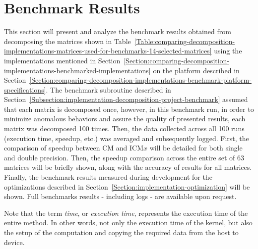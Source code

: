 \section{Benchmark Results \TO}\label{Section:comparing-decomposition-implementations-benchmark-results}
This section will present and analyze the benchmark results obtained from decomposing the matrices shown in Table~\ref{Table:comparing-decomposition-implementations-matrices-used-for-benchmarks-14-selected-matrices} using the implementations mentioned in Section~\ref{Section:comparing-decomposition-implementations-benchmarked-implementations} on the platform described in Section~\ref{Section:comparing-decomposition-implementations-benchmark-platform-specifications}. The benchmark subroutine described in Section~\ref{Subsection:implementation-decomposition-project-benchmark} assumed that each matrix is decomposed once, however, in this benchmark run, in order to minimize anomalous behaviors and assure the quality of presented results, each matrix was decomposed 100 times. Then, the data collected across all 100 runs (execution time, speedup, etc.) was averaged and subsequently logged. First, the comparison of speedup between CM and ICM$ x $ will be detailed for both single and double precision. Then, the speedup comparison across the entire set of 63 matrices will be briefly shown, along with the accuracy of results for all matrices. Finally, the benchmark results measured during development for the optimizations described in Section~\ref{Section:implementation-optimization} will be shown. Full benchmarks results - including logs - are available upon request.
\par Note that the term \textit{time}, or \textit{execution time}, represents the execution time of the entire  method. In other words, not only the execution time of the kernel, but also the setup of the computation and copying the required data from the host to device.

